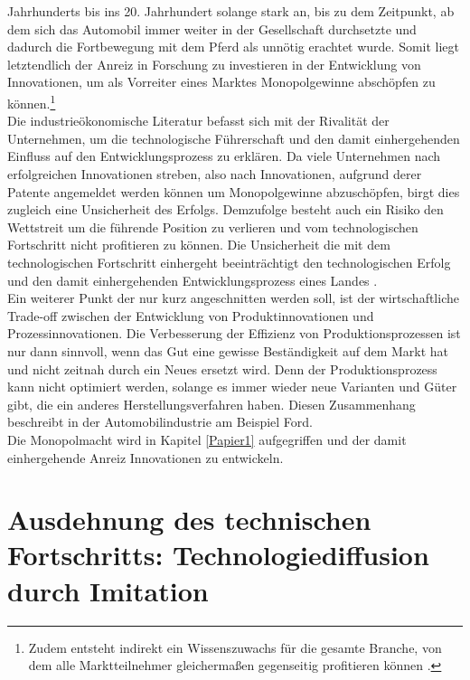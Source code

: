 Jahrhunderts bis ins 20. Jahrhundert solange stark an, bis zu dem Zeitpunkt, ab dem sich das Automobil immer weiter in der Gesellschaft durchsetzte und dadurch die Fortbewegung mit dem Pferd als unn{\"o}tig erachtet wurde. Somit liegt letztendlich der Anreiz in Forschung zu investieren in der Entwicklung von Innovationen, um als Vorreiter eines Marktes Monopolgewinne abschöpfen zu können.\footnote{Zudem entsteht indirekt ein Wissenszuwachs f{\"u}r die gesamte Branche, von dem alle Marktteilnehmer gleicherma{\ss}en gegenseitig profitieren k{\"o}nnen \citep{Cohen.1989}.}\\


Die industrie{\"o}konomische Literatur befasst sich mit der Rivalit{\"a}t der Unternehmen, um die technologische F{\"u}hrerschaft und den damit einhergehenden Einfluss auf den Entwicklungsprozess zu erklären. Da viele Unternehmen nach erfolgreichen Innovationen streben, also nach Innovationen, aufgrund derer Patente angemeldet werden k{\"o}nnen um Monopolgewinne abzuschöpfen, birgt dies zugleich eine Unsicherheit des Erfolgs. Demzufolge besteht auch ein Risiko den Wettstreit um die f{\"u}hrende Position zu verlieren und vom technologischen Fortschritt nicht profitieren zu k{\"o}nnen. Die Unsicherheit die mit dem technologischen Fortschritt einhergeht beeinträchtigt den technologischen Erfolg und den damit einhergehenden Entwicklungsprozess eines Landes \citep{Reinganum.1981}.\\ Ein weiterer Punkt der nur kurz angeschnitten werden soll, ist der wirtschaftliche Trade-off zwischen der Entwicklung von Produktinnovationen und Prozessinnovationen. Die Verbesserung der Effizienz von Produktionsprozessen ist nur dann sinnvoll, wenn das Gut eine gewisse Beständigkeit auf dem Markt hat und nicht zeitnah durch ein Neues ersetzt wird. Denn der Produktionsprozess kann nicht optimiert werden, solange es immer wieder neue Varianten und G{\"u}ter gibt, die ein anderes Herstellungsverfahren haben. Diesen Zusammenhang beschreibt \citet{Abernathy.1978} in der Automobilindustrie am Beispiel Ford.\\


Die Monopolmacht wird in Kapitel \ref{Papier1} aufgegriffen und der damit einhergehende  Anreiz Innovationen zu entwickeln. 



\section[Ausdehnung des technischen Fortschritts: Technologiediffusion durch Imitation]{Ausdehnung des technischen Fortschritts: Technologiediffusion durch Imitation}



